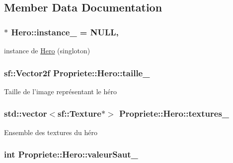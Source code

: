 \subsection{Member Data Documentation}
\hypertarget{classPropriete_1_1Hero_a1511a7e0960fe6425770bf30102c6162}{
\subsubsection[{instance\-\_\-}]{ $\ast$ Hero\-::instance\-\_\- = N\-U\-L\-L\hspace{0.3cm}{\ttfamily [static]}, {\ttfamily [private]}}}\label{classPropriete_1_1Hero_a1511a7e0960fe6425770bf30102c6162}
instance de \hyperlink{classPropriete_1_1Hero}{Hero} (singloton) \hypertarget{classPropriete_1_1Hero_a0cd5ec1ca2d96f46ebd62a4a96696173}{
\subsubsection[{taille\-\_\-}]{\setlength{\rightskip}{0pt plus 5cm}sf\-::\-Vector2f Propriete\-::\-Hero\-::taille\-\_\-\hspace{0.3cm}{\ttfamily [private]}}}\label{classPropriete_1_1Hero_a0cd5ec1ca2d96f46ebd62a4a96696173}
Taille de l'image représentant le héro \hypertarget{classPropriete_1_1Hero_a35ff814aef4ef7c70da4cbfc827cf60a}{
\subsubsection[{textures\-\_\-}]{\setlength{\rightskip}{0pt plus 5cm}std\-::vector$<$sf\-::\-Texture$\ast$$>$ Propriete\-::\-Hero\-::textures\-\_\-\hspace{0.3cm}{\ttfamily [private]}}}\label{classPropriete_1_1Hero_a35ff814aef4ef7c70da4cbfc827cf60a}
Ensemble des textures du héro \hypertarget{classPropriete_1_1Hero_a95aa9ba8572fa1d9fff696ba7317a071}{
\subsubsection[{valeur\-Saut\-\_\-}]{\setlength{\rightskip}{0pt plus 5cm}int Propriete\-::\-Hero\-::valeur\-Saut\-\_\-\hspace{0.3cm}{\ttfamily [private]}}}\label{classPropriete_1_1Hero_a95aa9ba8572fa1d9fff696ba7317a071}
